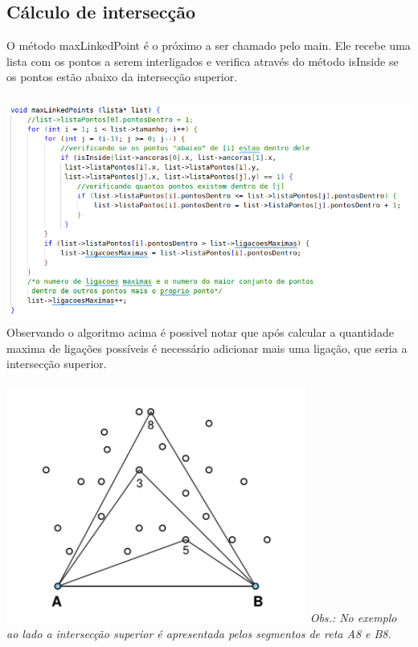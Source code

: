 \documentclass[12pt]{article}
\begin{document}
        \subsection{Cálculo de intersecção}
            O método maxLinkedPoint é o próximo a ser chamado pelo main. Ele recebe uma lista com
            os pontos a serem interligados e verifica através do método isInside se os pontos estão 
            abaixo da intersecção superior.\\\\
            \includegraphics[width=1.0\linewidth]{Figuras/2.png}\\
            Observando o algoritmo acima é possivel notar que após calcular a quantidade maxima
            de ligações possíveis é necessário adicionar mais uma ligação, que seria a intersecção 
            superior.\\\\
            \includegraphics[width=0.35\linewidth]{Figuras/5.png}
            \textit{Obs.: No exemplo ao lado a intersecção superior é apresentada pelos segmentos de reta A8 e B8.}\\
            
\end{document}
